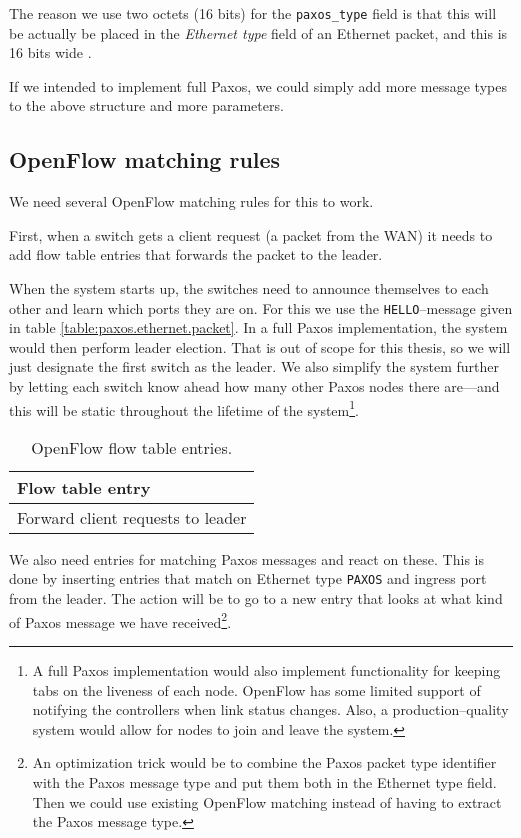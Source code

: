 The reason we use two octets (16 bits) for the \texttt{paxos\_{}type} field
is that this will be actually be placed in the \textit{Ethernet type} field
of an Ethernet packet, and this is 16 bits wide \cite{IEEE.802.3}.

If we intended to implement full Paxos, we could simply add more message
types to the above structure and more parameters.

\subsection{OpenFlow matching rules}

We need several OpenFlow matching rules for this to work.

First, when a switch gets a client request (a packet from the WAN) it needs
to add flow table entries that forwards the packet to the leader.

When the system starts up, the switches need to announce themselves to each
other and learn which ports they are on.  For this we use the
\texttt{HELLO}--message given in table \ref{table:paxos.ethernet.packet}.
In a full Paxos implementation, the system would then perform leader
election.  That is out of scope for this thesis, so we will just designate
the first switch as the leader.  We also simplify the system further by
letting each switch know ahead how many other Paxos nodes there are---and
this will be static throughout the lifetime of the system\footnote{A full
Paxos implementation would also implement functionality for keeping tabs
on the liveness of each node.  OpenFlow has some limited support of
notifying the controllers when link status changes.  Also, a
production--quality system would allow for nodes to join and leave the
system.}.

\begin{table}[H]
  \centering
  \begin{tabular}{|l|}
    \hline \textbf{Flow table entry} \\
    \hline Forward client requests to leader \\
    \hline
  \end{tabular}

  \caption{OpenFlow flow table entries.}
  \label{table:paxos.flowtable.entries}
\end{table}

We also need entries for matching Paxos messages and react on these.
This is done by inserting entries that match on Ethernet type
\texttt{PAXOS} and ingress port from the leader.
The action will be to go to a new entry that looks at what kind of Paxos
message we have received\footnote{An optimization trick would be to
combine the Paxos packet type identifier with the Paxos message type and put
them both in the Ethernet type field.  Then we could use existing OpenFlow
matching instead of having to extract the Paxos message type.}.


